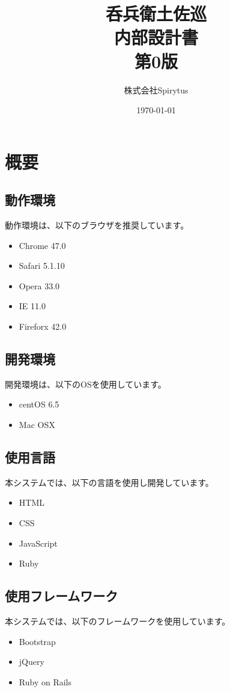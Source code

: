 \documentclass[a4j,titlepage]{jarticle}
\title{呑兵衛土佐巡\\
内部設計書\\
第0版}
\author{株式会社Spirytus}
\date{\today}
\begin{document}
\maketitle
\tableofcontents

\clearpage

\section{概要}
\subsection{動作環境}
動作環境は、以下のブラウザを推奨しています。
\begin{itemize}
\item Chrome 47.0
\item Safari 5.1.10
\item Opera 33.0
\item IE 11.0
\item Fireforx 42.0
\end{itemize}

\subsection{開発環境}
開発環境は、以下のOSを使用しています。
\begin{itemize}
\item centOS 6.5
\item Mac OSX
\end{itemize}

\subsection{使用言語}
本システムでは、以下の言語を使用し開発しています。
\begin{itemize}
\item HTML
\item CSS
\item JavaScript
\item Ruby
\end{itemize}

\subsection{使用フレームワーク}
本システムでは、以下のフレームワークを使用しています。
\begin{itemize}
\item Bootstrap
\item jQuery
\item Ruby on Rails
\end{itemize}
\end{document}
